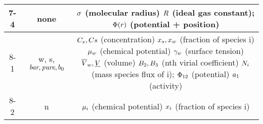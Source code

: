 \begin{tabular} { | c | c | c | }
    7-4 & none & \shortstack{$\molecrad$ (molecular radius) \\ $\gasconst$ (ideal gas constant); \\ $\pot(\pos)$ (potential + position)} \\  \hline
    8-1 & w, s,$\textit{bar},\textit{pure}, b_{\init}$ & \shortstack{$\conc_{s}, \conc s$ (concentration) \\ $\specfrac{s}, \specfrac{w}$ (fraction of species i) \\ $\chempot_{w}$ (chemical potential) \\ $\surftens_{w}$ (surface tension) \\ $\overline{\vol}_{w}, \uline{\vol}$ (volume) \\ $\virialcoeff{2}, \virialcoeff{3}$ (nth virial coefficient) \\ $\massspecflux{i}$ (mass species flux of i);\\ $\pot_{12}$ (potential)\\ $\activity_{1}$  (activity)}  \\ \hline
    8-2 & n & \shortstack{$\chempot_{i}$ (chemical potential) \\ $\specfrac{i}$ (fraction of species i)} \\ \hline
\end{tabular}
